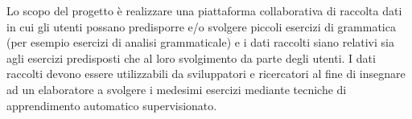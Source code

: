 Lo scopo del progetto è realizzare una piattaforma collaborativa di raccolta dati in cui gli utenti possano predisporre
e/o svolgere piccoli esercizi di grammatica (per esempio esercizi di analisi grammaticale) e i dati raccolti
siano relativi sia agli esercizi predisposti che al loro svolgimento da parte degli utenti. I dati raccolti devono
essere utilizzabili da sviluppatori e ricercatori al fine di insegnare ad un elaboratore a svolgere i medesimi esercizi
mediante tecniche di apprendimento automatico supervisionato.

